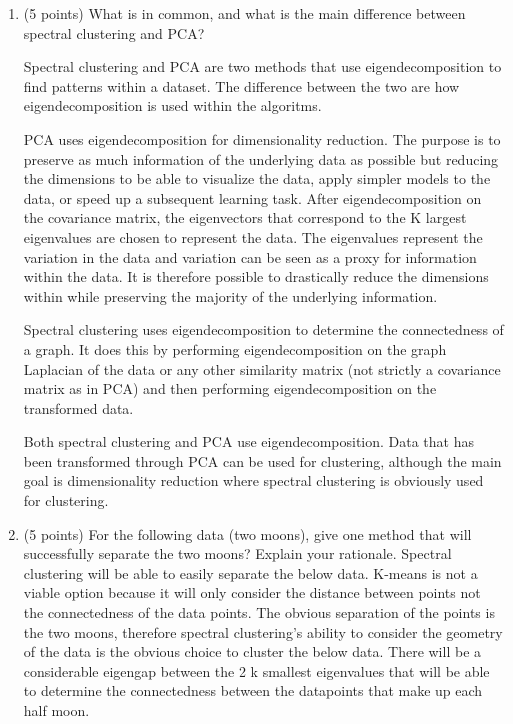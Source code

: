 \documentclass[a4paper,12pt,fleqn]{article}
\begin{document}
\begin{enumerate}
\item (5 points) What is in common, and what is the main difference between spectral clustering and PCA?

\vspace{.15in}
Spectral clustering and PCA are two methods that use eigendecomposition to find patterns within a dataset.  The difference between the two are how eigendecomposition is used within the algoritms.  

PCA uses eigendecomposition for dimensionality reduction.  The purpose is to preserve as much information of the underlying data as possible but reducing the dimensions to be able to visualize the data, apply simpler models to the data, or speed up a subsequent learning task.  After eigendecomposition on the covariance matrix, the eigenvectors that correspond to the K largest eigenvalues are chosen to represent the data.  The eigenvalues represent the variation in the data and variation can be seen as a proxy for information within the data.  It is therefore possible to drastically reduce the dimensions within while preserving the majority of the underlying information.  

Spectral clustering uses eigendecomposition to determine the connectedness of a graph.  It does this by  performing eigendecomposition on the graph Laplacian of the data or any other similarity matrix (not strictly a covariance matrix as in PCA) and then performing eigendecomposition on the transformed data.  

Both spectral clustering and PCA use eigendecomposition.  Data that has been transformed through PCA can be used for clustering, although the main goal is dimensionality reduction where spectral clustering is obviously used for clustering.

\vspace{.15in}

\item (5 points) For the following data (two moons), give one method that will successfully separate the two moons? Explain your rationale. 
\vspace{.15in}
Spectral clustering will be able to easily separate the below data.  K-means is not a viable option because it will only consider the distance between points not the connectedness of the data points.  The obvious separation of the points is the two moons, therefore spectral clustering's ability to consider the geometry of the data is the obvious choice to cluster the below data.  There will be a considerable eigengap between the 2 k smallest eigenvalues that will be able to determine the connectedness between the datapoints that make up each half moon.


\end{enumerate}
\end{document}
